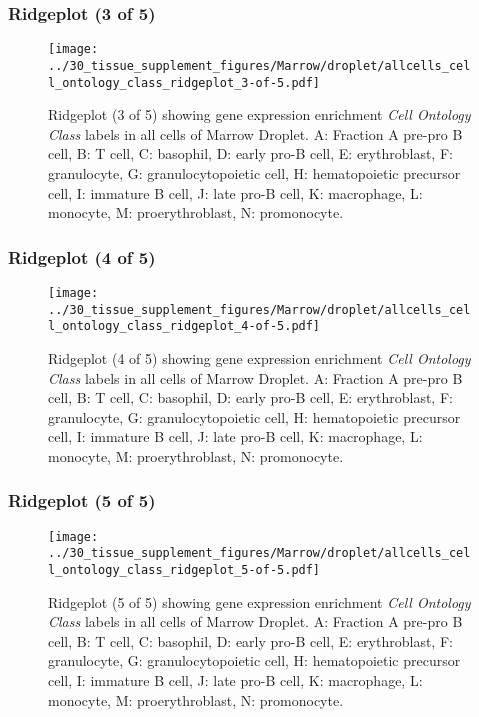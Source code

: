 \clearpage

\subsubsection{Ridgeplot (3 of 5)}
\begin{figure}[h]
\centering
\texttt{[image: ../30\_tissue\_supplement\_figures/Marrow/droplet/allcells\_cell\_ontology\_class\_ridgeplot\_3-of-5.pdf]}

\caption{ Ridgeplot (3 of 5)  showing gene expression enrichment \emph{Cell Ontology Class} labels in all cells of Marrow Droplet. A: Fraction A pre-pro B cell, B: T cell, C: basophil, D: early pro-B cell, E: erythroblast, F: granulocyte, G: granulocytopoietic cell, H: hematopoietic precursor cell, I: immature B cell, J: late pro-B cell, K: macrophage, L: monocyte, M: proerythroblast, N: promonocyte.}
\end{figure}


\clearpage

\subsubsection{Ridgeplot (4 of 5)}
\begin{figure}[h]
\centering
\texttt{[image: ../30\_tissue\_supplement\_figures/Marrow/droplet/allcells\_cell\_ontology\_class\_ridgeplot\_4-of-5.pdf]}

\caption{ Ridgeplot (4 of 5)  showing gene expression enrichment \emph{Cell Ontology Class} labels in all cells of Marrow Droplet. A: Fraction A pre-pro B cell, B: T cell, C: basophil, D: early pro-B cell, E: erythroblast, F: granulocyte, G: granulocytopoietic cell, H: hematopoietic precursor cell, I: immature B cell, J: late pro-B cell, K: macrophage, L: monocyte, M: proerythroblast, N: promonocyte.}
\end{figure}


\clearpage

\subsubsection{Ridgeplot (5 of 5)}
\begin{figure}[h]
\centering
\texttt{[image: ../30\_tissue\_supplement\_figures/Marrow/droplet/allcells\_cell\_ontology\_class\_ridgeplot\_5-of-5.pdf]}

\caption{ Ridgeplot (5 of 5)  showing gene expression enrichment \emph{Cell Ontology Class} labels in all cells of Marrow Droplet. A: Fraction A pre-pro B cell, B: T cell, C: basophil, D: early pro-B cell, E: erythroblast, F: granulocyte, G: granulocytopoietic cell, H: hematopoietic precursor cell, I: immature B cell, J: late pro-B cell, K: macrophage, L: monocyte, M: proerythroblast, N: promonocyte.}
\end{figure}


